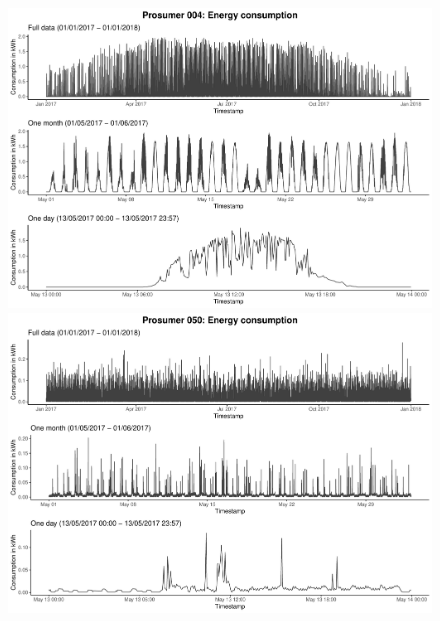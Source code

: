 \begin{figure}
    \centering
    \begin{minipage}[h]{\dimexpr.5\textheight-0.15em}
    \includegraphics[width=\textwidth]{thesis/graphs/timeseries/p004_cons.pdf}
    \end{minipage}
    \begin{minipage}[h]{\dimexpr.5\textheight-0.15em}
    \includegraphics[width=\textwidth]{thesis/graphs/timeseries/p050_cons.pdf}
    \end{minipage}\\
    

\end{figure}
